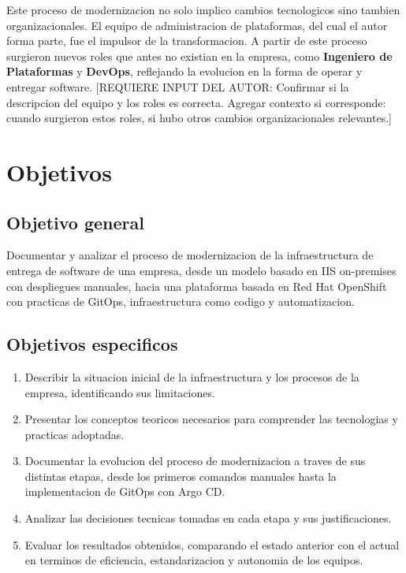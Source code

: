Este proceso de modernizacion no solo implico cambios tecnologicos sino
tambien organizacionales. El equipo de administracion de plataformas,
del cual el autor forma parte, fue el impulsor de la transformacion. A
partir de este proceso surgieron nuevos roles que antes no existian en
la empresa, como \textbf{Ingeniero de Plataformas} y \textbf{DevOps},
reflejando la evolucion en la forma de operar y entregar software.
{[}REQUIERE INPUT DEL AUTOR: Confirmar si la descripcion del equipo y
los roles es correcta. Agregar contexto si corresponde: cuando surgieron
estos roles, si hubo otros cambios organizacionales relevantes.{]}

\hypertarget{objetivos}{%
\section{Objetivos}\label{objetivos}}

\hypertarget{objetivo-general}{%
\subsection{Objetivo general}\label{objetivo-general}}

Documentar y analizar el proceso de modernizacion de la infraestructura
de entrega de software de una empresa, desde un modelo basado en IIS
on-premises con despliegues manuales, hacia una plataforma basada en Red
Hat OpenShift con practicas de GitOps, infraestructura como codigo y
automatizacion.

\hypertarget{objetivos-especificos}{%
\subsection{Objetivos especificos}\label{objetivos-especificos}}

\begin{enumerate}
\def\labelenumi{\arabic{enumi}.}
\tightlist
\item
  Describir la situacion inicial de la infraestructura y los procesos de
  la empresa, identificando sus limitaciones.
\item
  Presentar los conceptos teoricos necesarios para comprender las
  tecnologias y practicas adoptadas.
\item
  Documentar la evolucion del proceso de modernizacion a traves de sus
  distintas etapas, desde los primeros comandos manuales hasta la
  implementacion de GitOps con Argo CD.
\item
  Analizar las decisiones tecnicas tomadas en cada etapa y sus
  justificaciones.
\item
  Evaluar los resultados obtenidos, comparando el estado anterior con el
  actual en terminos de eficiencia, estandarizacion y autonomia de los
  equipos.
\end{enumerate}

